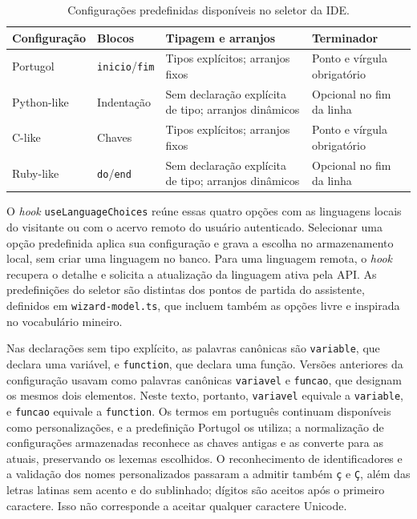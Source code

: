 \begin{table}[htbp]
\centering
\caption{Configurações predefinidas disponíveis no seletor da IDE.}
\label{tab:linguagens-predefinidas}
\footnotesize
\renewcommand{\arraystretch}{1.15}
\begin{tabular}{|p{2.3cm}|p{2.8cm}|p{4cm}|p{4cm}|}
\hline
\textbf{Configuração} & \textbf{Blocos} & \textbf{Tipagem e arranjos} & \textbf{Terminador} \\\hline
Portugol & \texttt{inicio}/\texttt{fim} & Tipos explícitos; arranjos fixos & Ponto e vírgula obrigatório \\\hline
Python-like & Indentação & Sem declaração explícita de tipo; arranjos dinâmicos & Opcional no fim da linha \\\hline
C-like & Chaves & Tipos explícitos; arranjos fixos & Ponto e vírgula obrigatório \\\hline
Ruby-like & \texttt{do}/\texttt{end} & Sem declaração explícita de tipo; arranjos dinâmicos & Opcional no fim da linha \\\hline
\end{tabular}
\end{table}

O \textit{hook} \texttt{useLanguageChoices} reúne essas quatro opções com as linguagens locais do visitante ou com o acervo remoto do usuário autenticado. Selecionar uma opção predefinida aplica sua configuração e grava a escolha no armazenamento local, sem criar uma linguagem no banco. Para uma linguagem remota, o \textit{hook} recupera o detalhe e solicita a atualização da linguagem ativa pela API. As predefinições do seletor são distintas dos pontos de partida do assistente, definidos em \texttt{wizard-model.ts}, que incluem também as opções livre e inspirada no vocabulário mineiro.

Nas declarações sem tipo explícito, as palavras canônicas são \texttt{variable}, que declara uma variável, e \texttt{function}, que declara uma função. Versões anteriores da configuração usavam como palavras canônicas \texttt{variavel} e \texttt{funcao}, que designam os mesmos dois elementos. Neste texto, portanto, \texttt{variavel} equivale a \texttt{variable}, e \texttt{funcao} equivale a \texttt{function}. Os termos em português continuam disponíveis como personalizações, e a predefinição Portugol os utiliza; a normalização de configurações armazenadas reconhece as chaves antigas e as converte para as atuais, preservando os lexemas escolhidos. O reconhecimento de identificadores e a validação dos nomes personalizados passaram a admitir também \texttt{ç} e \texttt{Ç}, além das letras latinas sem acento e do sublinhado; dígitos são aceitos após o primeiro caractere. Isso não corresponde a aceitar qualquer caractere Unicode.

